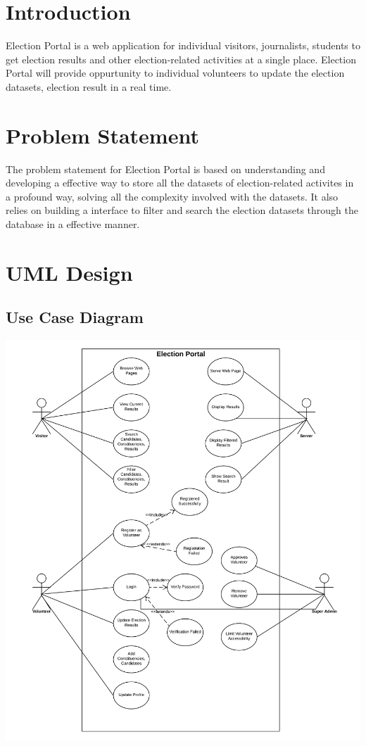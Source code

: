 \documentclass[12pt, a4paper, titlepage]{report}
\begin{document}
\section{Introduction}
Election Portal is a web application for individual visitors, journalists, students to get election results and other election-related activities at a single place. Election Portal will provide oppurtunity to individual volunteers to update the election datasets, election result in a real time.

\section{Problem Statement}
The problem statement for Election Portal is based on understanding and developing a effective way to store all the datasets of election-related activites in a profound way, solving all the complexity involved with the datasets. It also relies on building a interface to filter and search the election datasets through the database in a effective manner.

\newpage
\section{UML Design}
\subsection{Use Case Diagram}
\includegraphics[scale=0.6]{election_portal_use_case_diagram.png}\\
\end{document}

